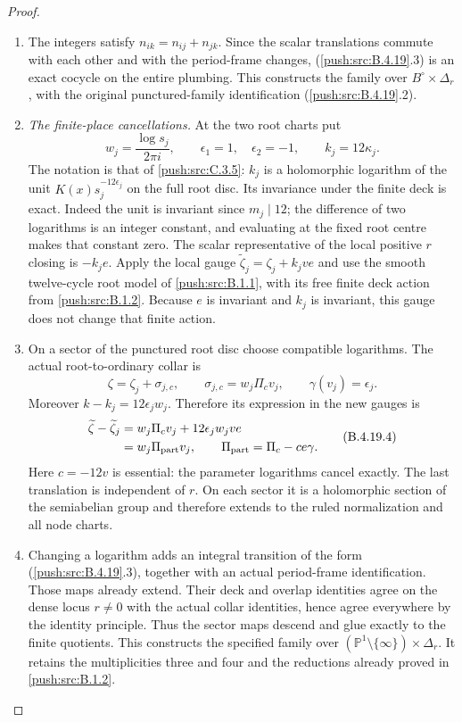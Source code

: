\begin{proof}
\begin{enumerate}[label=\arabic*.,leftmargin=*]
\item The integers satisfy
$n_{ik}=n_{ij}+n_{jk}$. Since the scalar translations
commute with each other and with the period-frame
changes, (\ref{push:src:B.4.19}.3) is an exact cocycle on the entire
plumbing. This constructs the family over
$B^\circ\times\Delta_r$, with the original
punctured-family identification (\ref{push:src:B.4.19}.2).

\item \emph{The finite-place cancellations.}
At the two root charts put
\[
 w_j=\frac{\log s_j}{2\pi i},\qquad
 \epsilon_1=1,\quad\epsilon_2=-1,
 \qquad k_j=12\kappa_j.
\]
The notation is that of \ref{push:src:C.3.5}: $k_j$ is a
holomorphic logarithm of the unit
$K(x)s_j^{-12\epsilon_j}$ on the full root disc.
Its invariance under the finite deck is exact.
Indeed the unit is invariant since $m_j\mid12$;
the difference of two logarithms is an integer
constant, and evaluating at the fixed root centre
makes that constant zero. The scalar representative
of the local positive $r$ closing is $-k_j e$.
Apply the local gauge
$\widetilde\zeta_j=\zeta_j+k_jve$ and use the
smooth twelve-cycle root model of \ref{push:src:B.1.1}, with its
free finite deck action from \ref{push:src:B.1.2}. Because $e$ is
invariant and $k_j$ is invariant, this gauge does
not change that finite action.

\item On a sector of the punctured root disc choose
compatible logarithms. The actual root-to-ordinary
collar is
\[
 \zeta=\zeta_j+\sigma_{j,c},\qquad
 \sigma_{j,c}=w_j\Pi_c v_j,
 \qquad \gamma(v_j)=\epsilon_j.
\]
Moreover $k-k_j=12\epsilon_jw_j$. Therefore its
expression in the new gauges is
\[
 \begin{aligned}
 \widetilde\zeta-\widetilde\zeta_j
 &=w_j\Pi_c v_j+12\epsilon_jw_jve\\
 &=w_j\Pi_{\rm part}v_j,
 \qquad \Pi_{\rm part}=\Pi_c-ce\gamma.
 \end{aligned}
 \tag{B.4.19.4}
\]
Here $c=-12v$ is essential: the parameter logarithms
cancel exactly. The last translation is independent
of $r$. On each sector it is a holomorphic section
of the semiabelian group and therefore extends to
the ruled normalization and all node charts.

\item Changing a logarithm adds an integral transition
of the form (\ref{push:src:B.4.19}.3), together with an actual
period-frame identification. Those maps already
extend. Their deck and overlap identities agree
on the dense locus $r\ne0$ with the actual collar
identities, hence agree everywhere by the identity
principle. Thus the sector maps descend and glue
exactly to the finite quotients. This constructs
the specified family over
$(\mathbb P^1\setminus\{\infty\})\times\Delta_r$.
It retains the multiplicities three and four and
the reductions already proved in \ref{push:src:B.1.2}.


\end{enumerate}
\end{proof}
